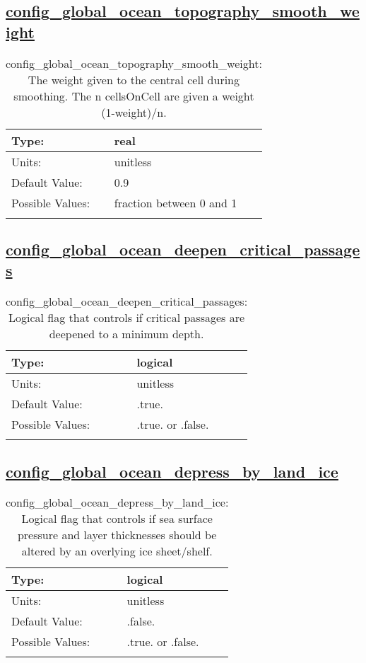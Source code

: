 \subsection[config\_global\_ocean\_topography\_smooth\_weight]{\hyperref[sec:nm_tab_global_ocean]{config\_global\_ocean\_topography\_smooth\_weight}}
\label{subsec:nm_sec_config_global_ocean_topography_smooth_weight}
\begin{center}
\begin{longtable}{| p{2.0in} || p{4.0in} |}
    \hline
    Type: & real \\
    \hline
    Units: & \si{unitless} \\
    \hline
    Default Value: & 0.9 \\
    \hline
    Possible Values: & fraction between 0 and 1 \\
    \hline
    \caption{config\_global\_ocean\_topography\_smooth\_weight: The weight given to the central cell during smoothing.  The n cellsOnCell are given a weight (1-weight)/n.}
\end{longtable}
\end{center}
\subsection[config\_global\_ocean\_deepen\_critical\_passages]{\hyperref[sec:nm_tab_global_ocean]{config\_global\_ocean\_deepen\_critical\_passages}}
\label{subsec:nm_sec_config_global_ocean_deepen_critical_passages}
\begin{center}
\begin{longtable}{| p{2.0in} || p{4.0in} |}
    \hline
    Type: & logical \\
    \hline
    Units: & \si{unitless} \\
    \hline
    Default Value: & .true. \\
    \hline
    Possible Values: & .true. or .false. \\
    \hline
    \caption{config\_global\_ocean\_deepen\_critical\_passages: Logical flag that controls if critical passages are deepened to a minimum depth.}
\end{longtable}
\end{center}
\subsection[config\_global\_ocean\_depress\_by\_land\_ice]{\hyperref[sec:nm_tab_global_ocean]{config\_global\_ocean\_depress\_by\_land\_ice}}
\label{subsec:nm_sec_config_global_ocean_depress_by_land_ice}
\begin{center}
\begin{longtable}{| p{2.0in} || p{4.0in} |}
    \hline
    Type: & logical \\
    \hline
    Units: & \si{unitless} \\
    \hline
    Default Value: & .false. \\
    \hline
    Possible Values: & .true. or .false. \\
    \hline
    \caption{config\_global\_ocean\_depress\_by\_land\_ice: Logical flag that controls if sea surface pressure and layer thicknesses should be altered by an overlying ice sheet/shelf.}
\end{longtable}
\end{center}
